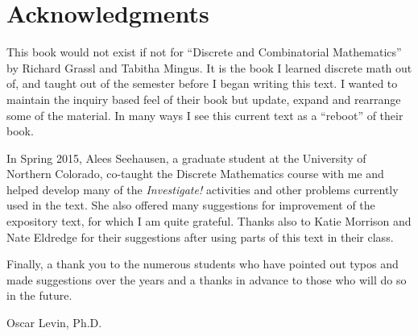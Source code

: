 \section*{Acknowledgments}

This book would not exist if not for ``Discrete and Combinatorial Mathematics'' by Richard Grassl and Tabitha Mingus.  It is the book I learned discrete math out of, and taught out of the semester before I began writing this text.  I wanted to maintain the inquiry based feel of their book but update, expand and rearrange some of the material.  In many ways I see this current text as a  ``reboot'' of their book.

In Spring 2015, Alees Seehausen, a graduate student at the University of Northern Colorado, co-taught the Discrete Mathematics course with me and helped develop many of the \emph{Investigate!} activities  and other problems currently used in the text.  She also offered many suggestions for improvement of the expository text, for which I am quite grateful.  Thanks also to Katie Morrison and Nate Eldredge for their suggestions after using parts of this text in their class.

Finally, a thank you to the numerous students who have pointed out typos and made suggestions over the years and a thanks in advance to those who will do so in the future.

\begin{flushright}
Oscar Levin, Ph.D.
\end{flushright}
\newpage